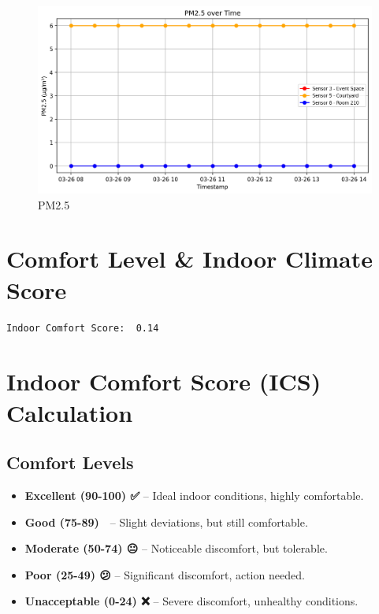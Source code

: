 \documentclass[
  12pt,
  letterpaper,
]{article}
\providecommand{\tightlist}{%
  \setlength{\itemsep}{0pt}\setlength{\parskip}{0pt}}\usepackage{longtable,booktabs,array}
\begin{document}
\begin{figure}[H]

{\centering \includegraphics[width=0.85\linewidth,height=\textheight,keepaspectratio]{./charts/pm_chart.png}

}

\caption{PM2.5}

\end{figure}%

\section{Comfort Level \& Indoor Climate
Score}\label{comfort-level-indoor-climate-score}

\begin{verbatim}
Indoor Comfort Score:  0.14
\end{verbatim}

\section{\texorpdfstring{\textbf{Indoor Comfort Score (ICS)
Calculation}}{Indoor Comfort Score (ICS) Calculation}}\label{indoor-comfort-score-ics-calculation}

\subsection{\texorpdfstring{\textbf{Comfort
Levels}}{Comfort Levels}}\label{comfort-levels}

\begin{itemize}
\tightlist
\item
  \textbf{Excellent (90-100) ✅} -- Ideal indoor conditions, highly
  comfortable.\\
\item
  \textbf{Good (75-89) 🙂} -- Slight deviations, but still
  comfortable.\\
\item
  \textbf{Moderate (50-74) 😐} -- Noticeable discomfort, but
  tolerable.\\
\item
  \textbf{Poor (25-49) 😕} -- Significant discomfort, action needed.\\
\item
  \textbf{Unacceptable (0-24) ❌} -- Severe discomfort, unhealthy
  conditions.
\end{itemize}
\end{document}
